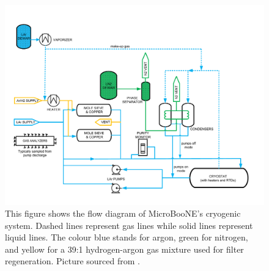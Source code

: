 \begin{figure}[htbp]
    \centering
    \includegraphics[width=1.0\textwidth]{images/MicroBooNE/CryoSystem.pdf}
    \caption[Flow Diagram of MicroBooNE's Cryogenic System]{This figure shows the flow diagram of MicroBooNE's cryogenic system. Dashed lines represent gas lines while solid lines represent liquid lines. The colour blue stands for argon, green for nitrogen, and yellow for a 39:1 hydrogen-argon gas mixture used for filter regeneration. Picture sourced from \cite{MicroBooNEDetector}.}
    \label{fig:CryoSystem}
\end{figure}

